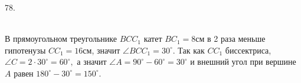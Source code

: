 78. \begin{figure}[ht!]
\end{figure}\\
В прямоугольном треугольнике $BCC_1$ катет $BC_1=8$см в 2 раза меньше гипотенузы $CC_1=16$см, значит $\angle BCC_1=30^\circ.$ Так как $CC_1$ биссектриса, $\angle C=2\cdot30^\circ=60^\circ,$ а значит $\angle A=90^\circ-60^\circ=30^\circ$ и внешний угол при вершине $A$ равен $180^\circ-30^\circ=150^\circ.$\\
